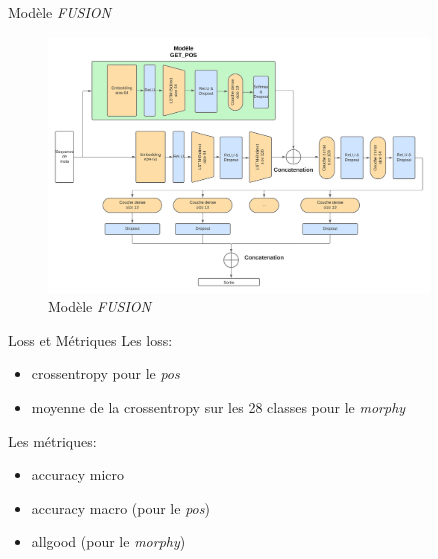 \documentclass[11pt]{beamer}
\begin{document}
\begin{frame}{Modèle \textit{FUSION}}
    \begin{figure}[!ht]
        \centering
        \includegraphics[width=0.9\textwidth]{get_morphy_fusion.png}
        \caption{Modèle \textit{FUSION}}
        \label{fig: model fusion}
    \end{figure}
\end{frame}

\begin{frame}{Loss et Métriques}
    Les loss:
    \begin{itemize}
        \item crossentropy pour le \textit{pos}
        \item moyenne de la crossentropy sur les 28 classes pour le \textit{morphy}
    \end{itemize}
    Les métriques:
    \begin{itemize}
        \item accuracy micro
        \item accuracy macro (pour le \textit{pos})
        \item allgood (pour le \textit{morphy})
    \end{itemize}
\end{frame}
\end{document}
